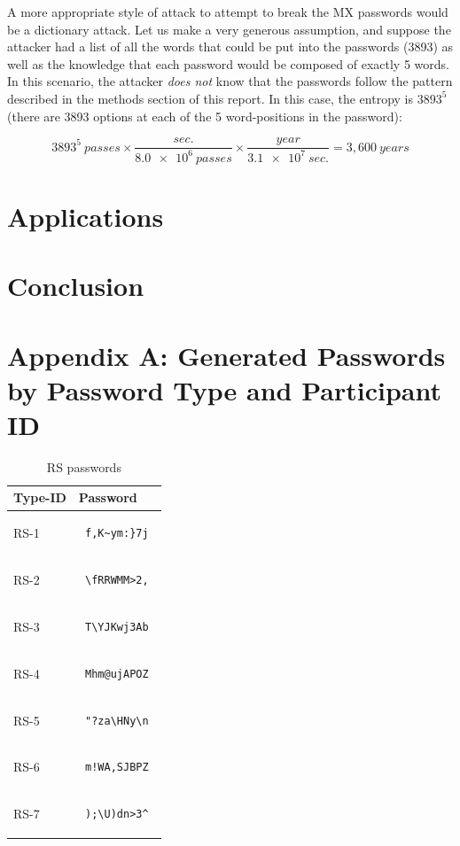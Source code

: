 \documentclass{article}
\begin{document}
A more appropriate style of attack to attempt to break the MX passwords would be a dictionary attack. Let us make a very generous assumption, and suppose the attacker had a list of all the words that could be put into the passwords (3893) as well as the knowledge that each password would be composed of exactly 5 words. In this scenario, the attacker \emph{does not} know that the passwords follow the pattern described in the methods section of this report. In this case, the entropy is $3893^5$ (there are 3893 options at each of the 5 word-positions in the password):

$$3893^5~passes \times \frac{sec.}{\num{8.0e6}~passes} \times \frac{year}{\num{3.1e7}~sec.} = 3,600~years$$

\FloatBarrier
\section*{Applications}

\section*{Conclusion}

\FloatBarrier
\section*{Appendix A: Generated Passwords by Password Type and Participant ID}
\centering
\begin{table}[h]
\begin{tabular}{|m{1.4cm}|m{8cm}|}
\hline
Type-ID & Password \\
\hline
RS-1 & \begin{verbatim} f,K~ym:}7j \end{verbatim} \\
\hline
RS-2 & \begin{verbatim} \fRRWMM>2, \end{verbatim} \\
\hline
RS-3 & \begin{verbatim} T\YJKwj3Ab \end{verbatim} \\
\hline
RS-4 & \begin{verbatim} Mhm@ujAPOZ \end{verbatim} \\
\hline
RS-5 & \begin{verbatim} "?za\HNy\n \end{verbatim} \\
\hline
RS-6 & \begin{verbatim} m!WA,SJBPZ \end{verbatim} \\
\hline
RS-7 & \begin{verbatim} );\U)dn>3^ \end{verbatim} \\
\hline
\end{tabular}
\caption{RS passwords}
\end{table}
\end{document}
